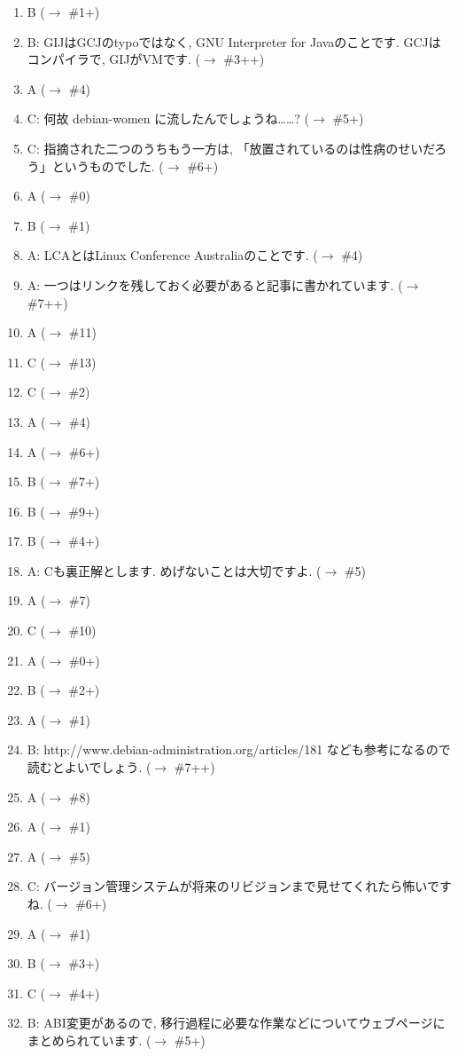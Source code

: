\documentclass[mingoth,a4paper]{jsarticle}
\begin{document}
\begin{enumerate}
 \item B ($\to$ \#1+)
 \item B: GIJはGCJのtypoではなく, GNU Interpreter for Javaのことです. GCJはコンパイラで, GIJがVMです. ($\to$ \#3++)
 \item A ($\to$ \#4)
 \item C: 何故 debian-women に流したんでしょうね……? ($\to$ \#5+)
 \item C: 指摘された二つのうちもう一方は, 「放置されているのは性病のせいだろう」というものでした. ($\to$ \#6+)
 \item A ($\to$ \#0)
 \item B ($\to$ \#1)
 \item A: LCAとはLinux Conference Australiaのことです. ($\to$ \#4)
 \item A: 一つはリンクを残しておく必要があると記事に書かれています. ($\to$ \#7++)
 \item A ($\to$ \#11)
 \item C ($\to$ \#13)
 \item C ($\to$ \#2)
 \item A ($\to$ \#4)
 \item A ($\to$ \#6+)
 \item B ($\to$ \#7+)
 \item B ($\to$ \#9+)
 \item B ($\to$ \#4+)
 \item A: Cも裏正解とします. めげないことは大切ですよ. ($\to$ \#5)
 \item A ($\to$ \#7)
 \item C ($\to$ \#10)
 \item A ($\to$ \#0+)
 \item B ($\to$ \#2+)
 \item A ($\to$ \#1)
 \item B: http://www.debian-administration.org/articles/181 なども参考になるので読むとよいでしょう. ($\to$ \#7++)
 \item A ($\to$ \#8)
 \item A ($\to$ \#1)
 \item A ($\to$ \#5)
 \item C: バージョン管理システムが将来のリビジョンまで見せてくれたら怖いですね. ($\to$ \#6+)
 \item A ($\to$ \#1)
 \item B ($\to$ \#3+)
 \item C ($\to$ \#4+)
 \item B: ABI変更があるので, 移行過程に必要な作業などについてウェブページにまとめられています. ($\to$ \#5+)

\end{enumerate}
\end{document}
